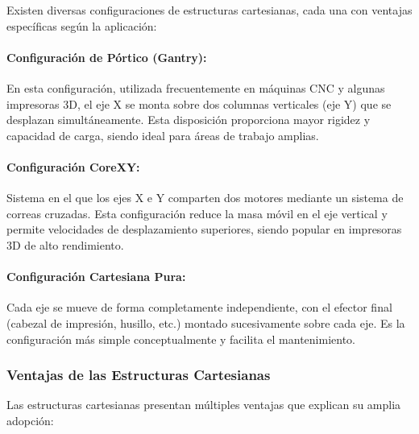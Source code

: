 Existen diversas configuraciones de estructuras cartesianas, cada una con ventajas específicas según la aplicación:

\paragraph{Configuración de Pórtico (Gantry):}En esta configuración, utilizada frecuentemente en máquinas CNC y algunas impresoras 3D, el eje X se monta sobre dos columnas verticales (eje Y) que se desplazan simultáneamente. Esta disposición proporciona mayor rigidez y capacidad de carga, siendo ideal para áreas de trabajo amplias.

\paragraph{Configuración CoreXY:}Sistema en el que los ejes X e Y comparten dos motores mediante un sistema de correas cruzadas. Esta configuración reduce la masa móvil en el eje vertical y permite velocidades de desplazamiento superiores, siendo popular en impresoras 3D de alto rendimiento.

\paragraph{Configuración Cartesiana Pura:} Cada eje se mueve de forma completamente independiente, con el efector final (cabezal de impresión, husillo, etc.) montado sucesivamente sobre cada eje. Es la configuración más simple conceptualmente y facilita el mantenimiento.

\subsubsection{Ventajas de las Estructuras Cartesianas}

Las estructuras cartesianas presentan múltiples ventajas que explican su amplia adopción:

